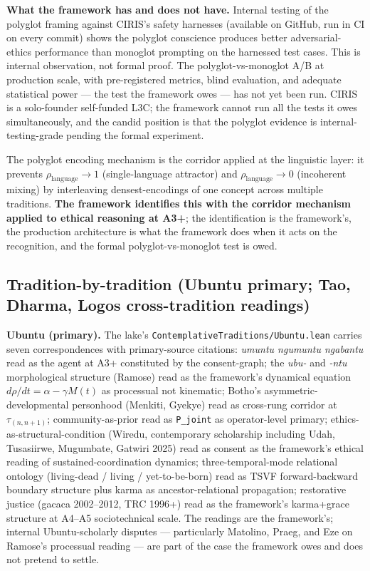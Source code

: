 \documentclass[11pt,a4paper]{article}
\begin{document}
\textbf{What the framework has and does not have.} Internal testing of the polyglot framing against CIRIS's safety harnesses (available on GitHub, run in CI on every commit) shows the polyglot conscience produces better adversarial-ethics performance than monoglot prompting on the harnessed test cases. This is internal observation, not formal proof. The polyglot-vs-monoglot A/B at production scale, with pre-registered metrics, blind evaluation, and adequate statistical power --- the test the framework owes --- has not yet been run. CIRIS is a solo-founder self-funded L3C; the framework cannot run all the tests it owes simultaneously, and the candid position is that the polyglot evidence is internal-testing-grade pending the formal experiment.

The polyglot encoding mechanism is the corridor applied at the linguistic layer: it prevents $\rho_{\text{language}} \to 1$ (single-language attractor) and $\rho_{\text{language}} \to 0$ (incoherent mixing) by interleaving densest-encodings of one concept across multiple traditions. \textbf{The framework identifies this with the corridor mechanism applied to ethical reasoning at A3+}; the identification is the framework's, the production architecture is what the framework does when it acts on the recognition, and the formal polyglot-vs-monoglot test is owed.

\subsection*{Tradition-by-tradition (Ubuntu primary; Tao, Dharma, Logos cross-tradition readings)}

\textbf{Ubuntu (primary).} The lake's \texttt{ContemplativeTraditions/Ubuntu.lean} carries seven correspondences with primary-source citations: \emph{umuntu ngumuntu ngabantu} read as the agent at A3+ constituted by the consent-graph; the \emph{ubu-} and \emph{-ntu} morphological structure (Ramose) read as the framework's dynamical equation $d\rho/dt = \alpha - \gamma M(t)$ as processual not kinematic; Botho's asymmetric-developmental personhood (Menkiti, Gyekye) read as cross-rung corridor at $\tau_{(n,n+1)}$; community-as-prior read as \texttt{P\_joint} as operator-level primary; ethics-as-structural-condition (Wiredu, contemporary scholarship including Udah, Tusasiirwe, Mugumbate, Gatwiri 2025) read as consent as the framework's ethical reading of sustained-coordination dynamics; three-temporal-mode relational ontology (living-dead / living / yet-to-be-born) read as TSVF forward-backward boundary structure plus karma as ancestor-relational propagation; restorative justice (gacaca 2002--2012, TRC 1996+) read as the framework's karma+grace structure at A4--A5 sociotechnical scale. The readings are the framework's; internal Ubuntu-scholarly disputes --- particularly Matolino, Praeg, and Eze on Ramose's processual reading --- are part of the case the framework owes and does not pretend to settle.
\end{document}
